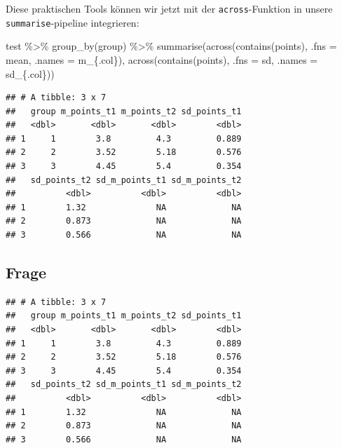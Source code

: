 \documentclass[
]{book}
\newenvironment{Shaded}{\begin{snugshade}}{\end{snugshade}}
\newcommand{\AttributeTok}[1]{\textcolor[rgb]{0.77,0.63,0.00}{#1}}
\newcommand{\FunctionTok}[1]{\textcolor[rgb]{0.00,0.00,0.00}{#1}}
\newcommand{\NormalTok}[1]{#1}
\newcommand{\SpecialCharTok}[1]{\textcolor[rgb]{0.00,0.00,0.00}{#1}}
\newcommand{\StringTok}[1]{\textcolor[rgb]{0.31,0.60,0.02}{#1}}
\begin{document}
Diese praktischen Tools können wir jetzt mit der \texttt{across}-Funktion in unsere \texttt{summarise}-pipeline integrieren:

\begin{Shaded}
\begin{Highlighting}[]
\NormalTok{test }\SpecialCharTok{\%\textgreater{}\%} 
  \FunctionTok{group\_by}\NormalTok{(group) }\SpecialCharTok{\%\textgreater{}\%} 
  \FunctionTok{summarise}\NormalTok{(}\FunctionTok{across}\NormalTok{(}\FunctionTok{contains}\NormalTok{(}\StringTok{\textquotesingle{}points\textquotesingle{}}\NormalTok{),}
                   \AttributeTok{.fns =}\NormalTok{ mean,}
                   \AttributeTok{.names =} \StringTok{\textquotesingle{}m\_\{.col\}\textquotesingle{}}\NormalTok{),}
            \FunctionTok{across}\NormalTok{(}\FunctionTok{contains}\NormalTok{(}\StringTok{\textquotesingle{}points\textquotesingle{}}\NormalTok{),}
                   \AttributeTok{.fns =}\NormalTok{ sd,}
                   \AttributeTok{.names =} \StringTok{\textquotesingle{}sd\_\{.col\}\textquotesingle{}}\NormalTok{))}
\end{Highlighting}
\end{Shaded}

\begin{verbatim}
## # A tibble: 3 x 7
##   group m_points_t1 m_points_t2 sd_points_t1
##   <dbl>       <dbl>       <dbl>        <dbl>
## 1     1        3.8         4.3         0.889
## 2     2        3.52        5.18        0.576
## 3     3        4.45        5.4         0.354
##   sd_points_t2 sd_m_points_t1 sd_m_points_t2
##          <dbl>          <dbl>          <dbl>
## 1        1.32              NA             NA
## 2        0.873             NA             NA
## 3        0.566             NA             NA
\end{verbatim}

\hypertarget{frage}{%
\subsection{Frage}\label{frage}}

\begin{verbatim}
## # A tibble: 3 x 7
##   group m_points_t1 m_points_t2 sd_points_t1
##   <dbl>       <dbl>       <dbl>        <dbl>
## 1     1        3.8         4.3         0.889
## 2     2        3.52        5.18        0.576
## 3     3        4.45        5.4         0.354
##   sd_points_t2 sd_m_points_t1 sd_m_points_t2
##          <dbl>          <dbl>          <dbl>
## 1        1.32              NA             NA
## 2        0.873             NA             NA
## 3        0.566             NA             NA
\end{verbatim}
\end{document}
